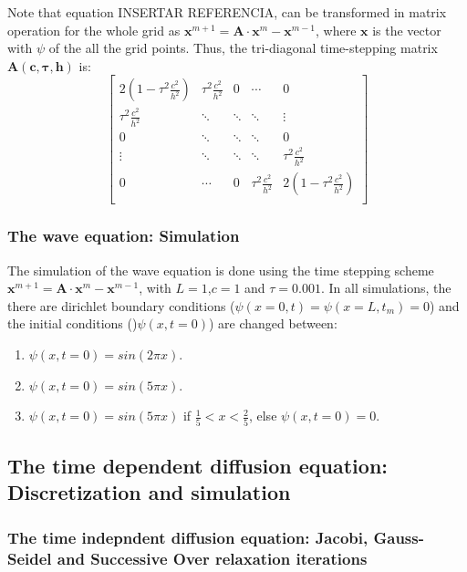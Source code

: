 Note that equation INSERTAR REFERENCIA, can be transformed in matrix operation for the whole grid as $\mathbf{x}^{m+1}= \mathbf{A} \cdot \mathbf{x}^{m} - \mathbf{x}^{m-1}$, where $\mathbf{x}$ is the vector
with $\psi$ of the all the grid points. Thus, the tri-diagonal time-stepping matrix $\mathbf{A(c,\tau,h)}$ is:
\[
    \begin{bmatrix}
        2(1 - \tau^{2}\frac{c^{2}}{h^2}) & \tau^{2}\frac{c^{2}}{h^2} & 0      & \cdots                    & 0                                \\
        \tau^{2}\frac{c^{2}}{h^2}        & \ddots                    & \ddots & \ddots                    & \vdots                           \\
        0                                & \ddots                    & \ddots & \ddots                    & 0                                \\
        \vdots                           & \ddots                    & \ddots & \ddots                    & \tau^{2}\frac{c^{2}}{h^2}        \\
        0                                & \cdots                    & 0      & \tau^{2}\frac{c^{2}}{h^2} & 2(1 - \tau^{2}\frac{c^{2}}{h^2}) \\
    \end{bmatrix}
\]

\subsubsection{The wave equation: Simulation}
The simulation of the wave equation is done using the time stepping scheme  $\mathbf{x}^{m+1}= \mathbf{A} \cdot \mathbf{x}^{m} - \mathbf{x}^{m-1}$, with $L=1$,$c=1$ and $\tau = 0.001$.
In all simulations, the there are dirichlet boundary conditions ($\psi(x = 0,t) = \psi(x = L,t_{m}) = 0$) and the initial conditions ()$\psi(x,t = 0)$) are changed between:
\begin{enumerate}
    \item $\psi(x,t = 0) = sin(2\pi x)$.
    \item $\psi(x,t = 0) = sin(5\pi x)$.
    \item $\psi(x,t = 0) = sin(5\pi x)$ if $\frac{1}{5} < x < \frac{2}{5}$, else $\psi(x,t = 0) = 0$.
\end{enumerate}

\subsection{The time dependent diffusion equation: Discretization and simulation}
\subsubsection{The time indepndent diffusion equation: Jacobi, Gauss-Seidel and Successive Over relaxation iterations}





